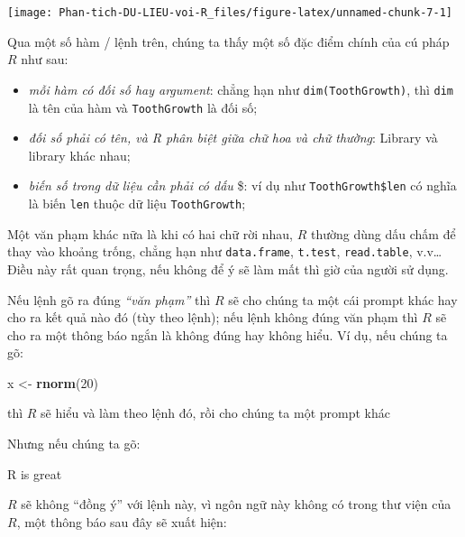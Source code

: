\documentclass[
]{book}
\newenvironment{Shaded}{\begin{snugshade}}{\end{snugshade}}
\newcommand{\DecValTok}[1]{\textcolor[rgb]{0.00,0.00,0.81}{#1}}
\newcommand{\KeywordTok}[1]{\textcolor[rgb]{0.13,0.29,0.53}{\textbf{#1}}}
\newcommand{\NormalTok}[1]{#1}
\newcommand{\StringTok}[1]{\textcolor[rgb]{0.31,0.60,0.02}{#1}}
\providecommand{\tightlist}{%
  \setlength{\itemsep}{0pt}\setlength{\parskip}{0pt}}
\begin{document}
\begin{center}\texttt{[image: Phan-tich-DU-LIEU-voi-R\_files/figure-latex/unnamed-chunk-7-1]} \end{center}

Qua một số hàm / lệnh trên, chúng ta thấy một số đặc điểm chính của cú pháp \(R\) như sau:

\begin{itemize}
\tightlist
\item
  \emph{mỗi hàm có đối số hay argument}: chẳng hạn như \texttt{dim(ToothGrowth)}, thì \texttt{dim} là tên của hàm và \texttt{ToothGrowth} là đối số;
\item
  \emph{đối số phải có tên, và R phân biệt giữa chữ hoa và chữ thường}: Library và library khác nhau;
\item
  \emph{biến số trong dữ liệu cần phải có dấu} \$: ví dụ như \texttt{ToothGrowth\$len} có nghĩa là biến \texttt{len} thuộc dữ liệu \texttt{ToothGrowth};
\end{itemize}

Một văn phạm khác nữa là khi có hai chữ rời nhau, \(R\) thường dùng dấu chấm để thay vào khoảng trống, chẳng hạn như \texttt{data.frame}, \texttt{t.test}, \texttt{read.table}, v.v\ldots Điều này rất quan trọng, nếu không để ý sẽ làm mất thì giờ của người sử dụng.

Nếu lệnh gõ ra đúng \emph{``văn phạm''} thì \(R\) sẽ cho chúng ta một cái prompt khác hay cho ra kết quả nào đó (tùy theo lệnh); nếu lệnh không đúng văn phạm thì \(R\) sẽ cho ra một thông báo ngắn là không đúng hay không hiểu. Ví dụ, nếu chúng ta gõ:

\begin{Shaded}
\begin{Highlighting}[]
\NormalTok{x \textless{}{-}}\StringTok{ }\KeywordTok{rnorm}\NormalTok{(}\DecValTok{20}\NormalTok{) }
\end{Highlighting}
\end{Shaded}

thì \(R\) sẽ hiểu và làm theo lệnh đó, rồi cho chúng ta một prompt khác

Nhưng nếu chúng ta gõ:

\begin{Shaded}
\begin{Highlighting}[]
\NormalTok{R is great}
\end{Highlighting}
\end{Shaded}

\(R\) sẽ không ``đồng ý'' với lệnh này, vì ngôn ngữ này không có trong thư viện của \(R\), một thông báo sau đây sẽ xuất hiện:
\end{document}
